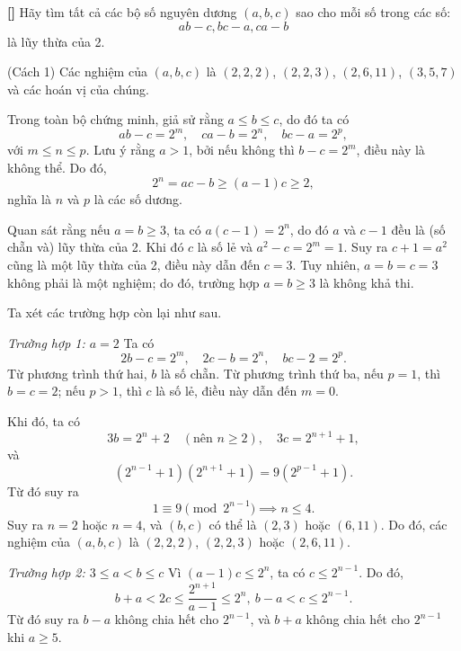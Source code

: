 \documentclass[../02-modular-arithmetic-b.tex]{subfiles}
\begin{document}
\begin{example*}\label{example:IMO-2015-P2}\textbf{[]}
	Hãy tìm tất cả các bộ số nguyên dương $(a, b, c)$ sao cho mỗi số trong các số:
	\[
		ab - c, bc - a, ca - b
	\]
	là lũy thừa của 2.
\end{example*}

\begin{soln}\footnotemark(Cách 1)
	Các nghiệm của \( (a,b,c) \) là \( (2,2,2) \), \( (2,2,3) \), \( (2,6,11) \), \( (3,5,7) \) và các hoán vị của chúng.

	Trong toàn bộ chứng minh, giả sử rằng \( a \leq b \leq c \), do đó ta có  
	\[
		ab - c = 2^m, \quad ca - b = 2^n, \quad bc - a = 2^p,
	\]
	với \( m \leq n \leq p \). Lưu ý rằng \( a > 1 \), bởi nếu không thì \( b - c = 2^m \), điều này là không thể. Do đó,  
	\[
		2^n = ac - b \geq (a - 1)c \geq 2,
	\]
	nghĩa là \( n \) và \( p \) là các số dương.
	
	Quan sát rằng nếu \( a = b \geq 3 \), ta có \( a(c - 1) = 2^n \), do đó \( a \) và \( c - 1 \) đều là (số chẵn và) lũy thừa của 2.
	Khi đó \( c \) là số lẻ và \( a^2 - c = 2^m = 1 \). Suy ra \( c+1 = a^2 \) cũng là một lũy thừa của 2, điều này dẫn đến \( c = 3 \).
	Tuy nhiên, \( a = b = c = 3 \) không phải là một nghiệm; do đó, trường hợp \( a = b \geq 3 \) là không khả thi.
	
	Ta xét các trường hợp còn lại như sau.
	
	\textit{Trường hợp 1: \( a = 2 \)}
	Ta có  
	\[
		2b - c = 2^m, \quad 2c - b = 2^n, \quad bc - 2 = 2^p.
	\]
	Từ phương trình thứ hai, \( b \) là số chẵn. Từ phương trình thứ ba, nếu \( p = 1 \), thì \( b = c = 2 \);
	nếu \( p > 1 \), thì \( c \) là số lẻ, điều này dẫn đến \( m = 0 \).
	
	Khi đó, ta có  
	\[
		3b = 2^n + 2 \quad (\text{nên } n \geq 2), \quad 3c = 2^{n+1} + 1,
	\]
	và  
	\[
		(2^{n-1} + 1)(2^{n+1} + 1) = 9(2^{p-1} + 1).
	\]
	Từ đó suy ra  
	\[
		1 \equiv 9 \pmod{2^{n-1}} \implies n \leq 4.
	\]
	Suy ra \( n = 2 \) hoặc \( n = 4 \), và \( (b,c) \) có thể là \( (2,3) \) hoặc \( (6,11) \).
	Do đó, các nghiệm của \( (a,b,c) \) là \( (2,2,2) \), \( (2,2,3) \) hoặc \( (2,6,11) \).
	
	\textit{Trường hợp 2: \( 3 \leq a < b \leq c \)}
	Vì \( (a - 1)c \leq 2^n \), ta có \( c \leq 2^{n-1} \). Do đó,
	\[
		b + a < 2c \leq \frac{2^{n+1}}{a-1} \leq 2^n,\ b - a < c \leq 2^{n-1}.
	\]
	Từ đó suy ra \( b - a \) không chia hết cho \( 2^{n-1} \), và \( b + a \) không chia hết cho \( 2^{n-1} \) khi \( a \geq 5 \).  
	

\end{soln}
\end{document}
